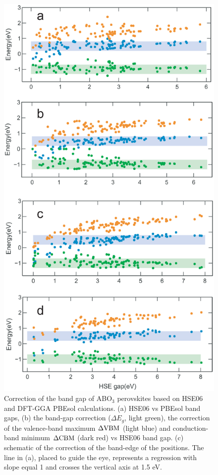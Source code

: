 \documentclass[%
reprint,
superscriptaddress,
citeautoscript,
 amsmath,amssymb,
 aps,
 prl,
floatfix,
]{revtex4-1}
\begin{document}
\begin{figure}[ht]
\begin{center}
\includegraphics[width=6in]{Figures/fig2.eps}
\end{center}
\caption{Correction of the band gap of ABO$_{3}$ perovskites based on HSE06 and DFT-GGA PBEsol calculations. (a) HSE06 vs PBEsol band gaps, (b) the band-gap correction ($\Delta E_{g}$, light green), the correction of the valence-band maximum $\Delta{\rm VBM}$ (light blue) and conduction-band minimum $\Delta{\rm CBM}$
(dark red) vs HSE06 band gap. (c) schematic of the correction of the band-edge of the positions. The line in (a), placed to guide the eye, represents a regression with slope equal 1 and crosses the vertical axis at 1.5 eV. 
}
\label{fig2}
\end{figure}
\end{document}
